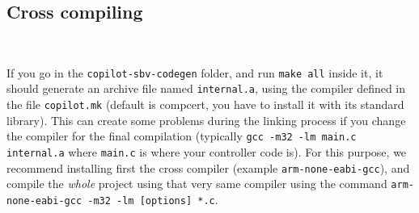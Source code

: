 
\subsection{Cross compiling}~\label{sec:cross}

If you go in the \texttt{copilot-sbv-codegen} folder, and run {\tt make all}
inside it, it should generate an archive file named \texttt{internal.a}, using
the compiler defined in the file \texttt{copilot.mk} (default is compcert, you
have to install it with its standard library). This can create some problems
during the linking process if you change the compiler for the final compilation
(typically \texttt{gcc -m32 -lm main.c internal.a} where \texttt{main.c} is
where your controller code is). For this purpose, we recommend installing first
the cross compiler (example \texttt{arm-none-eabi-gcc}), and compile the
\emph{whole} project using that very same compiler using the command \texttt{arm-none-eabi-gcc -m32 -lm [options] *.c}.
